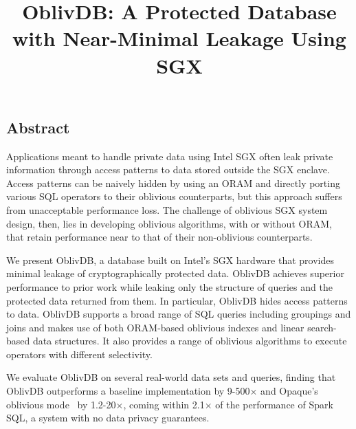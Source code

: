 \documentclass[letterpaper,twocolumn,10pt]{article}
\newcommand{\ignore}[1]{}
\def\name/{OblivDB}
\begin{document}
\date{}

\title{\Large \bf \name/: A Protected Database with Near-Minimal Leakage Using SGX}

\ignore{
\author{
{\rm Your N.\ Here}\\
Your Institution
\and
{\rm Second Name}\\
Second Institution
} %
}
\maketitle

\thispagestyle{empty}

 
\subsection*{Abstract}
Applications meant to handle private data using Intel SGX often leak private information through access patterns to data stored outside the SGX enclave. Access patterns can be naively hidden by using an ORAM and directly porting various SQL operators to their oblivious counterparts, but this approach suffers from unacceptable performance loss. The challenge of oblivious SGX system design, then, lies in developing oblivious algorithms, with or without ORAM, that retain performance near to that of their non-oblivious counterparts. 

We present \name/, a database built on Intel's SGX hardware that provides minimal leakage of cryptographically protected data. \name/ achieves superior performance to prior work while leaking only the structure of queries and the protected data returned from them. In particular, \name/ hides access patterns to data. \name/ supports a broad range of SQL queries including groupings and joins and makes use of both ORAM-based oblivious indexes and linear search-based data structures. It also provides a range of oblivious algorithms to execute operators with different selectivity. 

We evaluate \name/ on several real-world data sets and queries, finding that \name/ outperforms a baseline implementation by 9-500$\times$ and Opaque's oblivious mode~\cite{ZDB+17} by 1.2-20$\times$, coming within 2.1$\times$ of the performance of Spark SQL\cite{SparkSQL}, a system with no data privacy guarantees.  
\end{document}

